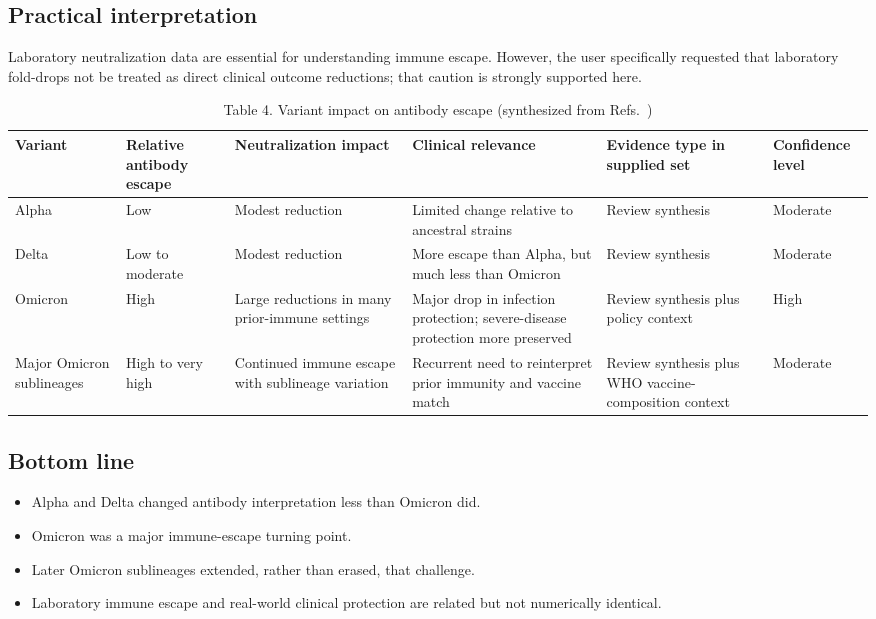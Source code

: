 \documentclass[12pt]{article}
\begin{document}
\subsection*{Practical interpretation}
Laboratory neutralization data are essential for understanding immune escape. However, the user specifically requested that laboratory fold-drops not be treated as direct clinical outcome reductions; that caution is strongly supported here.

\begin{table}[H]
\centering
\caption{Table 4. Variant impact on antibody escape (synthesized from Refs.~\cite{ref3,ref5,ref9,ref10})}
\begin{tabularx}{\textwidth}{>{\raggedright\arraybackslash}p{2.2cm} >{\raggedright\arraybackslash}p{2.0cm} >{\raggedright\arraybackslash}p{2.1cm} >{\raggedright\arraybackslash}X >{\raggedright\arraybackslash}p{2.0cm} >{\raggedright\arraybackslash}p{1.7cm}}
\toprule
Variant & Relative antibody escape & Neutralization impact & Clinical relevance & Evidence type in supplied set & Confidence level \\
\midrule
Alpha & Low & Modest reduction & Limited change relative to ancestral strains & Review synthesis & Moderate \\
Delta & Low to moderate & Modest reduction & More escape than Alpha, but much less than Omicron & Review synthesis & Moderate \\
Omicron & High & Large reductions in many prior-immune settings & Major drop in infection protection; severe-disease protection more preserved & Review synthesis plus policy context & High \\
Major Omicron sublineages & High to very high & Continued immune escape with sublineage variation & Recurrent need to reinterpret prior immunity and vaccine match & Review synthesis plus WHO vaccine-composition context & Moderate \\
\bottomrule
\end{tabularx}
\end{table}

\subsection*{Bottom line}
\begin{itemize}[leftmargin=1.5em]
    \item Alpha and Delta changed antibody interpretation less than Omicron did.
    \item Omicron was a major immune-escape turning point.
    \item Later Omicron sublineages extended, rather than erased, that challenge.
    \item Laboratory immune escape and real-world clinical protection are related but not numerically identical.
\end{itemize}
\end{document}

